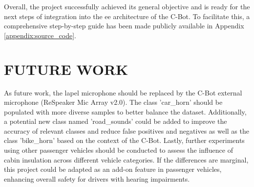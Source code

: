 Overall, the project successfully achieved its general objective and is ready for the next steps of integration into the \gls{ee} architecture of the C-Bot. To facilitate this, a comprehensive step-by-step guide has been made publicly available in Appendix \ref{appendix:source_code}.


\section{FUTURE WORK}
\label{sec:results_future_work}

As future work, the lapel microphone should be replaced by the C-Bot external microphone (ReSpeaker Mic Array v2.0). The class 'car\_horn' should be populated with more diverse samples to better balance the dataset. Additionally, a potential new class named 'road\_sounds' could be added to improve the accuracy of relevant classes and reduce false positives and negatives as well as the class 'bike\_horn' based on the context of the C-Bot. Lastly, further experiments using other passenger vehicles should be conducted to assess the influence of cabin insulation across different vehicle categories. If the differences are marginal, this project could be adapted as an add-on feature in passenger vehicles, enhancing overall safety for drivers with hearing impairments.